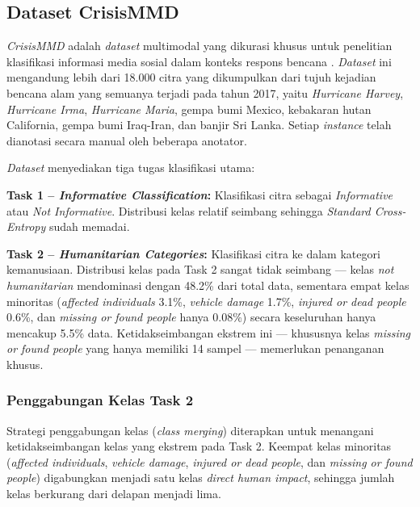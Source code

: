 \subsection{Dataset CrisisMMD} \label{II.Teori.Dataset}
\textit{CrisisMMD} adalah \textit{dataset} multimodal yang dikurasi
khusus untuk penelitian klasifikasi informasi media sosial dalam konteks
respons bencana \cite{alam2018crisismmd}. \textit{Dataset} ini
mengandung lebih dari 18.000 citra yang dikumpulkan dari tujuh kejadian
bencana alam yang semuanya terjadi pada tahun 2017, yaitu
\textit{Hurricane Harvey}, \textit{Hurricane Irma},
\textit{Hurricane Maria}, gempa bumi Mexico, kebakaran hutan California,
gempa bumi Iraq-Iran, dan banjir Sri Lanka. Setiap \textit{instance}
telah dianotasi secara manual oleh beberapa anotator. \par

\textit{Dataset} menyediakan tiga tugas klasifikasi utama: \par

\textbf{Task 1 -- \textit{Informative Classification}:} Klasifikasi
citra sebagai \textit{Informative} atau \textit{Not Informative}.
Distribusi kelas relatif seimbang sehingga \textit{Standard
Cross-Entropy} sudah memadai. \par

\textbf{Task 2 -- \textit{Humanitarian Categories}:} Klasifikasi citra
ke dalam kategori kemanusiaan. Distribusi kelas pada Task 2 sangat
tidak seimbang — kelas \textit{not humanitarian} mendominasi dengan
48.2\% dari total data, sementara empat kelas minoritas
(\textit{affected individuals} 3.1\%, \textit{vehicle damage} 1.7\%,
\textit{injured or dead people} 0.6\%, dan \textit{missing or found
people} hanya 0.08\%) secara keseluruhan hanya mencakup 5.5\% data.
Ketidakseimbangan ekstrem ini — khususnya kelas \textit{missing or
found people} yang hanya memiliki 14 sampel — memerlukan penanganan
khusus. \par

\subsubsection{Penggabungan Kelas Task 2}
\label{II.Teori.Dataset.Merge}
Strategi penggabungan kelas (\textit{class merging}) diterapkan untuk
menangani ketidakseimbangan kelas yang ekstrem pada Task 2. Keempat
kelas minoritas (\textit{affected individuals}, \textit{vehicle damage},
\textit{injured or dead people}, dan \textit{missing or found people})
digabungkan menjadi satu kelas \textit{direct human impact}, sehingga
jumlah kelas berkurang dari delapan menjadi lima. \par

